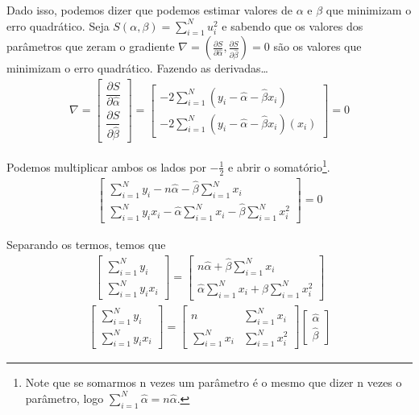 \documentclass[
  letterpaper,
  DIV=11,
  numbers=noendperiod]{scrreprt}
\theoremstyle{definition}
\theoremstyle{plain}
\theoremstyle{remark}
\begin{document}
Dado isso, podemos dizer que podemos estimar valores de \(\alpha\) e
\(\beta\) que minimizam o erro quadrático. Seja
\(S(\alpha, \beta) = \sum_{i=1}^{N} u_i^{2}\) e sabendo que os valores
dos parâmetros que zeram o gradiente
\(\nabla = \left(\frac{\partial S}{\partial \hat{\alpha}}, \frac{\partial S}{\partial \hat{\beta}}\right)=0\)
são os valores que minimizam o erro quadrático. Fazendo as
derivadas\ldots{} \[
\begin{aligned}
  \nabla = \begin{bmatrix}
    \dfrac{\partial S}{\partial \hat{\alpha}} \\
    \dfrac{\partial S}{\partial \hat{\beta}}
  \end{bmatrix} = \begin{bmatrix}
    -2\sum_{i=1}^{N} (y_{i} - \hat{\alpha} - \hat{\beta} x_{i}) \\
    -2\sum_{i=1}^{N} (y_{i} - \hat{\alpha} - \hat{\beta} x_{i})(x_{i})
  \end{bmatrix} = 0
\end{aligned}
\]

Podemos multiplicar ambos os lados por \(-\frac{1}{2}\) e abrir o
somatório\footnote{Note que se somarmos n vezes um parâmetro é o mesmo
  que dizer n vezes o parâmetro, logo
  \(\sum_{i=1}^{N}\hat{\alpha} = n\hat{\alpha}\).}. \[
\begin{aligned}
  \begin{bmatrix}
    \sum_{i=1}^{N} y_{i} - n\hat{\alpha} - \hat{\beta}\sum_{i=1}^{N} x_{i} \\
    \sum_{i=1}^{N} y_{i}x_{i} - \hat{\alpha}\sum_{i=1}^{N}x_{i} - \hat{\beta}\sum_{i=1}^{N} x_{i}^{2}
  \end{bmatrix} = 0
\end{aligned}
\]

Separando os termos, temos que \[
\begin{aligned}
  \begin{bmatrix}
    \sum_{i=1}^{N} y_{i} \\
    \sum_{i=1}^{N} y_{i}x_{i}
  \end{bmatrix} =
  \begin{bmatrix}
    n\hat{\alpha} + \hat{\beta}\sum_{i=1}^{N} x_{i} \\
    \hat{\alpha}\sum_{i=1}^{N}x_{i} + \hat{\beta}\sum_{i=1}^{N} x_{i}^{2}
  \end{bmatrix}
\end{aligned}
\] \[
\begin{aligned}
  \begin{bmatrix}
    \sum_{i=1}^{N} y_{i} \\
    \sum_{i=1}^{N} y_{i}x_{i}
  \end{bmatrix} =
  \begin{bmatrix}
    n & \sum_{i=1}^{N} x_{i} \\
    \sum_{i=1}^{N} x_{i} & \sum_{i=1}^{N} x_{i}^{2}
  \end{bmatrix}
  \begin{bmatrix}
    \hat{\alpha} \\
    \hat{\beta}
  \end{bmatrix}
\end{aligned}
\]
\end{document}
